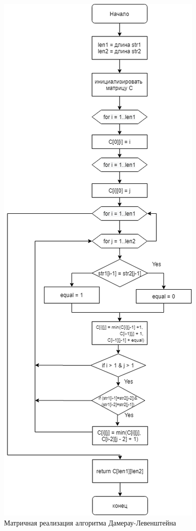 \documentclass[12pt, a4paper]{report}
\begin{document}
	\begin{figure}[ht!]
		\centering
		\includegraphics[scale=0.6]{Dia2.png}
		\caption{Матричная реализация алгоритма Дамерау-Левенштейна}
		\label{fig:damleven}
	\end{figure}
\end{document}
